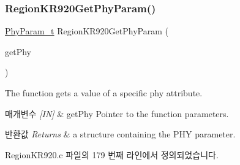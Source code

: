 \subsubsection{\texorpdfstring{Region\+K\+R920\+Get\+Phy\+Param()}{RegionKR920GetPhyParam()}}
{\footnotesize\ttfamily \mbox{\hyperlink{group___r_e_g_i_o_n_gaed159b26e5c4677236b6e8677019db30}{Phy\+Param\+\_\+t}} Region\+K\+R920\+Get\+Phy\+Param (\begin{DoxyParamCaption}\item[{\mbox{\hyperlink{group___r_e_g_i_o_n_gab471483fff904f4f89bbc03f7fc380ab}{Get\+Phy\+Params\+\_\+t}} $\ast$}]{get\+Phy }\end{DoxyParamCaption})}



The function gets a value of a specific phy attribute. 


\begin{DoxyParams}{매개변수}
{\em \mbox{[}\+I\+N\mbox{]}} & get\+Phy Pointer to the function parameters.\\
\hline
\end{DoxyParams}

\begin{DoxyRetVals}{반환값}
{\em Returns} & a structure containing the P\+HY parameter. \\
\hline
\end{DoxyRetVals}


Region\+K\+R920.\+c 파일의 179 번째 라인에서 정의되었습니다.


